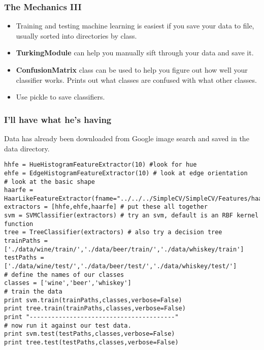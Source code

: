 \documentclass[compress]{beamer}
\begin{document}
\begin{frame}
  \frametitle{The Mechanics III}
\begin{itemize}
\item Training and testing machine learning is easiest if you save
  your data to file, usually sorted into directories by class.
\item \textbf{TurkingModule} can help you manually sift through your
  data and save it.
\item \textbf{ConfusionMatrix} class can be used to help you figure
  out how well your classifier works. Prints out what classes are
  confused with what other classes.
\item Use pickle to save classifiers.
\end{itemize}
\end{frame}
\begin{frame}[fragile] 
\frametitle{I'll have what he's having}
Data has already been downloaded from Google image search and saved in
the data directory. 
\begin{example}
\begin{verbatim}
hhfe = HueHistogramFeatureExtractor(10) #look for hue
ehfe = EdgeHistogramFeatureExtractor(10) # look at edge orientation
# look at the basic shape
haarfe = HaarLikeFeatureExtractor(fname="../../../SimpleCV/SimpleCV/Features/haar.txt")
extractors = [hhfe,ehfe,haarfe] # put these all together
svm = SVMClassifier(extractors) # try an svm, default is an RBF kernel function
tree = TreeClassifier(extractors) # also try a decision tree
trainPaths = ['./data/wine/train/','./data/beer/train/','./data/whiskey/train']
testPaths = ['./data/wine/test/','./data/beer/test/','./data/whiskey/test/']
# define the names of our classes
classes = ['wine','beer','whiskey']
# train the data
print svm.train(trainPaths,classes,verbose=False)
print tree.train(trainPaths,classes,verbose=False)
print "----------------------------------------"
# now run it against our test data.
print svm.test(testPaths,classes,verbose=False)
print tree.test(testPaths,classes,verbose=False)
\end{verbatim}
\end{example}
\end{frame} 
\end{document}
